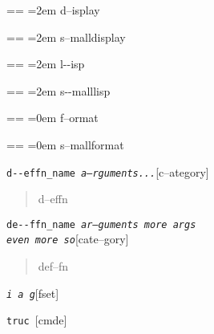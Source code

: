 \documentclass{book}
\makeatletter
\newcommand\GNUTexinfocommandstyletextvar[1]{{\normalfont{}\textsl{#1}}}%
\newenvironment{GNUTexinfopreformatted}{%
  \par\obeylines\obeyspaces\frenchspacing
  \parskip=\z@\parindent=\z@}{}
\makeatother
\begin{document}
\begin{titlepage}
\begin{GNUTexinfopreformatted}
\leftskip=2em\relax%
d--isplay
\end{GNUTexinfopreformatted}

\begin{GNUTexinfopreformatted}
\leftskip=2em\relax\footnotesize%
s--malldisplay
\end{GNUTexinfopreformatted}

\begin{GNUTexinfopreformatted}
\leftskip=2em\relax\ttfamily%
l{-}{-}isp
\end{GNUTexinfopreformatted}

\begin{GNUTexinfopreformatted}
\leftskip=2em\relax\ttfamily\footnotesize%
s{-}{-}malllisp
\end{GNUTexinfopreformatted}

\begin{GNUTexinfopreformatted}
\leftskip=0em\relax%
f--ormat
\end{GNUTexinfopreformatted}

\begin{GNUTexinfopreformatted}
\leftskip=0em\relax\footnotesize%
s--mallformat
\end{GNUTexinfopreformatted}

\noindent\texttt{d{-}{-}effn\_name \EmbracOn{}\textnormal{\textsl{a--rguments...}}\EmbracOff{}}\hfill[c--ategory]



%
\begin{quote}
\unskip{\parskip=0pt\noindent}%
d--effn
\end{quote}

\noindent\texttt{de{-}{-}ffn\_name \EmbracOn{}\textnormal{\textsl{ar--guments    more args \leavevmode{}\\ even more so}}\EmbracOff{}}\hfill[cate--gory]



%
\begin{quote}
\unskip{\parskip=0pt\noindent}%
def--fn
\end{quote}

\noindent\texttt{\GNUTexinfocommandstyletextvar{i} \EmbracOn{}\textnormal{\textsl{a g}}\EmbracOff{}}\hfill[fset]



\index[fn]{i@\texttt{\GNUTexinfocommandstyletextvar{i}}}%
%
\noindent\texttt{truc \EmbracOn{}\textnormal{\textsl{}}\EmbracOff{}}\hfill[cmde]




\end{titlepage}
\end{document}
